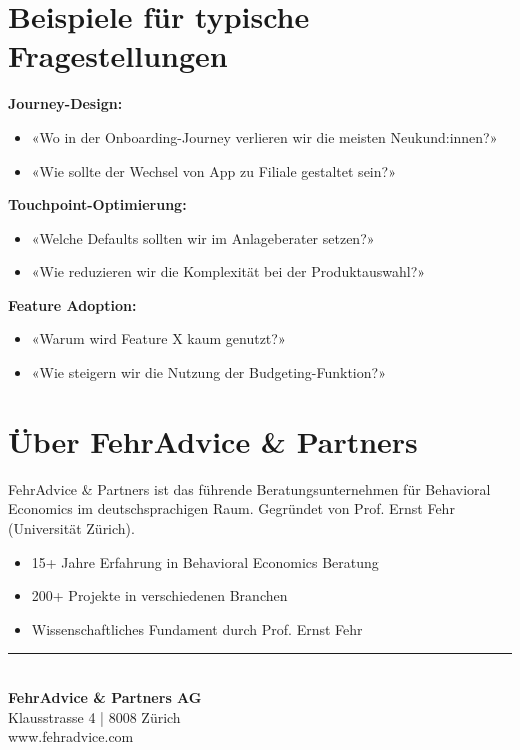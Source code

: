 \documentclass[11pt,a4paper]{article}
\begin{document}
\section{Beispiele für typische Fragestellungen}

\textbf{Journey-Design:}
\begin{itemize}
    \item «Wo in der Onboarding-Journey verlieren wir die meisten Neukund:innen?»
    \item «Wie sollte der Wechsel von App zu Filiale gestaltet sein?»
\end{itemize}

\textbf{Touchpoint-Optimierung:}
\begin{itemize}
    \item «Welche Defaults sollten wir im Anlageberater setzen?»
    \item «Wie reduzieren wir die Komplexität bei der Produktauswahl?»
\end{itemize}

\textbf{Feature Adoption:}
\begin{itemize}
    \item «Warum wird Feature X kaum genutzt?»
    \item «Wie steigern wir die Nutzung der Budgeting-Funktion?»
\end{itemize}

\section{Über FehrAdvice \& Partners}

FehrAdvice \& Partners ist das führende Beratungsunternehmen für Behavioral Economics im deutschsprachigen Raum. Gegründet von Prof. Ernst Fehr (Universität Zürich).

\begin{itemize}
    \item 15+ Jahre Erfahrung in Behavioral Economics Beratung
    \item 200+ Projekte in verschiedenen Branchen
    \item Wissenschaftliches Fundament durch Prof. Ernst Fehr
\end{itemize}

\vfill

\begin{center}
\textcolor{fadarkblue}{\rule{0.8\textwidth}{1pt}}\\[0.5cm]
\textbf{FehrAdvice \& Partners AG}\\
Klausstrasse 4 | 8008 Zürich\\
www.fehradvice.com
\end{center}
\end{document}
